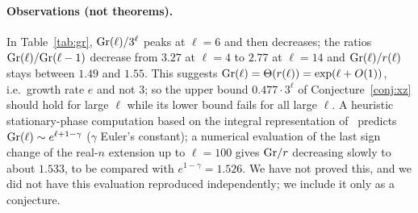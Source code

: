 \paragraph{Observations (not theorems).} In Table~\ref{tab:gr}, $\mathrm{Gr}(\ell)/3^\ell$ peaks at $\ell=6$ and then decreases; the ratios $\mathrm{Gr}(\ell)/\mathrm{Gr}(\ell-1)$ decrease from $3.27$ at $\ell=4$ to $2.77$ at $\ell=14$ and $\mathrm{Gr}(\ell)/r(\ell)$ stays between $1.49$ and $1.55$. This suggests $\mathrm{Gr}(\ell)=\Theta(r(\ell))=\exp(\ell+O(1))$, i.e.\ growth rate $e$ and not $3$; so the upper bound $0.477\cdot3^\ell$ of Conjecture~\ref{conj:xz} should hold for large $\ell$ while its lower bound fails for all large $\ell$. A heuristic stationary-phase computation based on the integral representation of~\cite{XZ} predicts $\mathrm{Gr}(\ell)\sim e^{\ell+1-\gamma}$ ($\gamma$ Euler's constant); a numerical evaluation of the last sign change of the real-$n$ extension up to $\ell=100$ gives $\mathrm{Gr}/r$ decreasing slowly to about $1.533$, to be compared with $e^{1-\gamma}=1.526$. We have not proved this, and we did not have this evaluation reproduced independently; we include it only as a conjecture.
